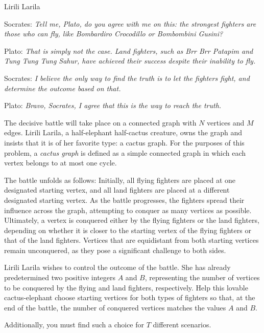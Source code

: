 \begin{statement}[
  problempoints=100,
  timelimit=2 seconds,
  memorylimit=512 MiB,
]{Lirili Larila}

Socrates:  
\textit{Tell me, Plato, do you agree with me on this:  
the strongest fighters are those who can fly, like Bombardiro Crocodillo or Bombombini Gusini?}

Plato:  
\textit{That is simply not the case. Land fighters, such as Brr Brr Patapim and Tung Tung Tung Sahur, 
have achieved their success despite their inability to fly.}

Socrates:  
\textit{I believe the only way to find the truth is to let the fighters fight, and  
determine the outcome based on that.}

Plato:  
\textit{Bravo, Socrates, I agree that this is the way to reach the truth.}

The decisive battle will take place on a connected graph with $N$ vertices and $M$ edges.  
Lirili Larila, a half-elephant half-cactus creature, owns the graph and insists that it is of her favorite type: a cactus graph.  
For the purposes of this problem, a \textit{cactus graph} is defined as a simple connected graph 
in which each vertex belongs to at most one cycle.

The battle unfolds as follows:  
Initially, all flying fighters are placed at one designated starting vertex, 
and all land fighters are placed at a different designated starting vertex.  
As the battle progresses, the fighters spread their influence across the graph, attempting to conquer as many vertices as possible.  
Ultimately, a vertex is conquered either by the flying fighters or the land fighters, depending on  
whether it is closer to the starting vertex of the flying fighters or that of the land fighters.  
Vertices that are equidistant from both starting vertices  
remain unconquered, as they pose a significant challenge to both sides.

Lirili Larila wishes to control the outcome of the battle.  
She has already predetermined two positive integers $A$ and $B$, 
representing the number of vertices to be conquered by the flying and land fighters, respectively.  
Help this lovable cactus-elephant choose starting vertices for both types of fighters 
so that, at the end of the battle, the number of conquered vertices matches the values $A$ and $B$.

Additionally, you must find such a choice for $T$ different scenarios.


\end{statement}
